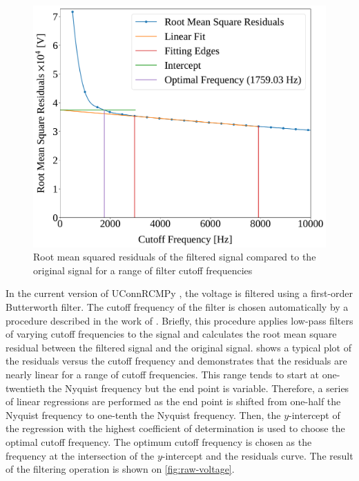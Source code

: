 \documentclass[12pt]{../ussci}
\begin{document}
\begin{figure}[htbp]
\begin{minipage}[t]{0.48\textwidth}
        \includegraphics[width=\linewidth]{figures/residuals.pdf}
        \caption{Root mean squared residuals of the filtered signal compared to the
        original signal for a range of filter cutoff frequencies}
        \label{fig:residuals}
    \end{minipage}
\end{figure}

In the current version of UConnRCMPy \autocite{uconnrcmpy}, the voltage is
filtered using a first-order Butterworth filter. The cutoff frequency of the
filter is chosen automatically by a procedure described in the work of
\textcite{Yu1999,Duarte2014}. Briefly, this procedure applies low-pass filters
of varying cutoff frequencies to the signal and calculates the root mean square
residual between the filtered signal and the original signal.
 shows a typical plot of the residuals versus the cutoff
frequency and demonstrates that the residuals are nearly linear for a range of
cutoff frequencies. This range tends to start at one-twentieth the Nyquist
frequency but the end point is variable. Therefore, a series of linear
regressions are performed as the end point is shifted from one-half the Nyquist
frequency to one-tenth the Nyquist frequency. Then, the $y$-intercept of the
regression with the highest coefficient of determination is used to choose the
optimal cutoff frequency. The optimum cutoff frequency is chosen as the
frequency at the intersection of the $y$-intercept and the residuals curve. The
result of the filtering operation is shown on \cref{fig:raw-voltage}.
\end{document}
